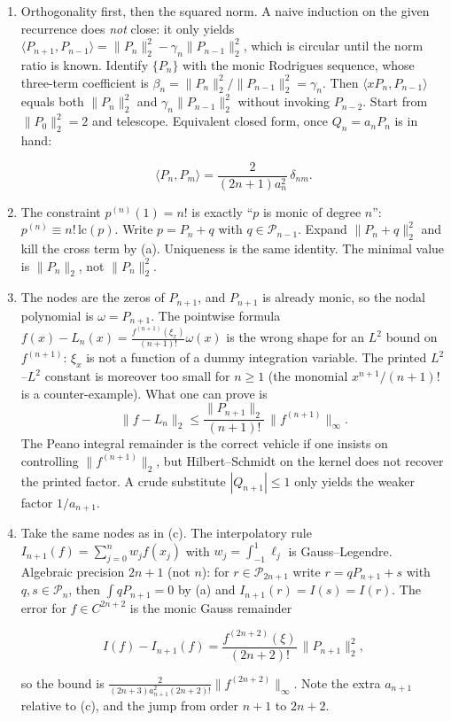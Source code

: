 \documentclass[11pt,a4paper]{article}
\begin{document}
\begin{enumerate}[label=\textup{(\alph*)}]
    \item
    Orthogonality first, then the squared norm. A naive induction on the given recurrence does \emph{not} close: it only yields \(\langle P_{n+1},P_{n-1}\rangle=\|P_n\|_2^2-\gamma_n\|P_{n-1}\|_2^2\), which is circular until the norm ratio is known. Identify \(\{P_n\}\) with the monic Rodrigues sequence, whose three-term coefficient is \(\beta_n=\|P_n\|_2^2/\|P_{n-1}\|_2^2=\gamma_n\). Then \(\langle xP_n,P_{n-1}\rangle\) equals both \(\|P_n\|_2^2\) and \(\gamma_n\|P_{n-1}\|_2^2\) without invoking \(P_{n-2}\). Start from \(\|P_0\|_2^2=2\) and telescope. Equivalent closed form, once \(Q_n=a_n P_n\) is in hand:

    \[
    \langle P_n,P_m\rangle
    =
    \frac{2}{(2n+1)a_n^2}\,\delta_{nm}.
    \]

    \item
    The constraint \(p^{(n)}(1)=n!\) is exactly ``\(p\) is monic of degree \(n\)'': \(p^{(n)}\equiv n!\,\mathrm{lc}(p)\). Write \(p=P_n+q\) with \(q\in\mathcal{P}_{n-1}\). Expand \(\|P_n+q\|_2^2\) and kill the cross term by (a). Uniqueness is the same identity. The minimal value is \(\|P_n\|_2\), not \(\|P_n\|_2^2\).

    \item
    The nodes are the zeros of \(P_{n+1}\), and \(P_{n+1}\) is already monic, so the nodal polynomial is \(\omega=P_{n+1}\). The pointwise formula \(f(x)-L_n(x)=\frac{f^{(n+1)}(\xi_x)}{(n+1)!}\omega(x)\) is the wrong shape for an \(L^2\) bound on \(f^{(n+1)}\): \(\xi_x\) is not a function of a dummy integration variable. The printed \(L^2\)--\(L^2\) constant is moreover too small for \(n\ge 1\) (the monomial \(x^{n+1}/(n+1)!\) is a counter-example). What one can prove is
    \[
    \|f-L_n\|_2
    \le
    \frac{\|P_{n+1}\|_2}{(n+1)!}\,\|f^{(n+1)}\|_\infty.
    \]
    The Peano integral remainder is the correct vehicle if one insists on controlling \(\|f^{(n+1)}\|_2\), but Hilbert--Schmidt on the kernel does not recover the printed factor. A crude substitute \(|Q_{n+1}|\le 1\) only yields the weaker factor \(1/a_{n+1}\).

    \item
    Take the same nodes as in (c). The interpolatory rule \(I_{n+1}(f)=\sum_{j=0}^n w_j f(x_j)\) with \(w_j=\int_{-1}^1 \ell_j\) is Gauss--Legendre. Algebraic precision \(2n+1\) (not \(n\)): for \(r\in\mathcal{P}_{2n+1}\) write \(r=qP_{n+1}+s\) with \(q,s\in\mathcal{P}_n\), then \(\int qP_{n+1}=0\) by (a) and \(I_{n+1}(r)=I(s)=I(r)\). The error for \(f\in C^{2n+2}\) is the monic Gauss remainder

    \[
    I(f)-I_{n+1}(f)
    =
    \frac{f^{(2n+2)}(\xi)}{(2n+2)!}\,\|P_{n+1}\|_2^2,
    \]

    so the bound is \(\frac{2}{(2n+3)a_{n+1}^2(2n+2)!}\|f^{(2n+2)}\|_\infty\). Note the extra \(a_{n+1}\) relative to (c), and the jump from order \(n+1\) to \(2n+2\).
\end{enumerate}
\end{document}
